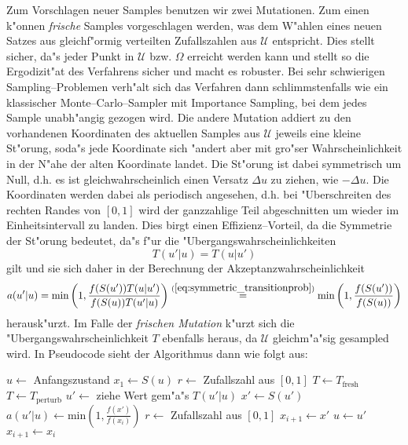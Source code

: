 	Zum Vorschlagen neuer Samples benutzen wir zwei Mutationen. Zum einen k"onnen {\em frische} Samples vorgeschlagen werden, was dem W"ahlen eines neuen Satzes aus gleichf"ormig verteilten Zufallszahlen aus $\mathcal{U}$ entspricht. Dies stellt sicher, da"s jeder Punkt in $\mathcal{U}$ bzw. $\Omega$ erreicht werden kann und stellt so die Ergodizit"at des Verfahrens sicher und macht es robuster. Bei sehr schwierigen Sampling--Problemen verh"alt sich das Verfahren dann schlimmstenfalls wie ein klassischer Monte--Carlo--Sampler mit Importance Sampling, bei dem jedes Sample unabh"angig gezogen wird.
	Die andere Mutation addiert zu den vorhandenen Koordinaten des aktuellen Samples aus $\mathcal{U}$ jeweils eine kleine St"orung, soda"s jede Koordinate sich "andert aber mit gro"ser Wahrscheinlichkeit in der N"ahe der alten Koordinate landet. Die St"orung ist dabei symmetrisch um Null, d.h. es ist gleichwahrscheinlich einen Versatz $\Delta u$ zu ziehen, wie $-\Delta u$. Die Koordinaten werden dabei als periodisch angesehen, d.h. bei "Uberschreiten des rechten Randes von $[0,1]$ wird der ganzzahlige Teil abgeschnitten um wieder im Einheitsintervall zu landen. Dies birgt einen Effizienz--Vorteil, da die Symmetrie der St"orung bedeutet, da"s f"ur die "Ubergangswahrscheinlichkeiten
	\begin{equation}
	  T(u'|u)=T(u|u')
	  \label{eq:symmetric_transitionprob}
	\end{equation}
	gilt und sie sich daher in der Berechnung der Akzeptanzwahrscheinlichkeit
	$$a(u'|u)=\text{min}\left(1,\frac{f(S(u'))T(u|u')}{f(S(u))T(u'|u)}\right)\stackrel{(\ref{eq:symmetric_transitionprob})}{=}\text{min}\left(1,\frac{f(S(u'))}{f(S(u))}\right)$$
	herausk"urzt. Im Falle der {\em frischen Mutation} k"urzt sich die "Ubergangswahrscheinlichkeit $T$ ebenfalls heraus, da $\mathcal{U}$ gleichm"a"sig gesampled wird.
	In Pseudocode sieht der Algorithmus dann wie folgt aus:
	\begin{algorithmic}
		\STATE $u \leftarrow$ Anfangszustand
		\STATE $x_1 \leftarrow S(u)$
			\STATE $r\leftarrow$ Zufallszahl aus $[0,1]$
						\STATE $T \leftarrow T_\text{fresh}$
				\STATE $T \leftarrow T_\text{perturb}$
			\ENDIF
			\STATE $u'\leftarrow$ ziehe Wert gem"a"s $T(u'|u)$
			\STATE $x' \leftarrow S(u')$
			\STATE $a(u'|u) \leftarrow \text{min}\left(1,\frac{f(x')}{f(x_i)}\right)$
			\STATE $r\leftarrow$ Zufallszahl aus $[0,1]$
			  \STATE $x_{i+1} \leftarrow x'$
			  \STATE $u \leftarrow u'$
			\ELSE	\STATE $x_{i+1} \leftarrow x_i$
			\ENDIF
	  \ENDFOR
	\end{algorithmic}

